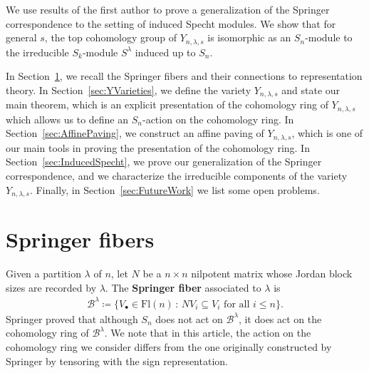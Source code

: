 \documentclass[submission]{FPSAC2021}
\theoremstyle{plain}
\numberwithin{equation}{section}
\newcommand{\SG}[1]{{\color{red} SG: #1}}
\newcommand{\bQ}{\mathbb{Q}}
\newcommand{\cB}{\mathcal{B}}
\newcommand{\st}{\,:\,}
\newcommand{\Fl}{\mathrm{Fl}}
\newcommand{\la}{\lambda}
\begin{document}
We use results of the first author to prove a generalization of the  Springer correspondence to the setting of induced Specht modules. We show that for general $s$, the top cohomology group of $Y_{n,\lambda,s}$ is isomorphic as an $S_n$-module to the irreducible $S_k$-module $S^\lambda$ induced up to $S_n$.

In Section~\ref{sec:SpringerFibers}, we recall the Springer fibers and their connections to representation theory.
In Section~\ref{sec:YVarieties}, we define the variety $Y_{n,\lambda,s}$ and state our main theorem, which is an explicit presentation of the cohomology ring of $Y_{n,\lambda,s}$ which allows us to define an $S_n$-action on the cohomology ring.
In Section~\ref{sec:AffinePaving}, we construct an affine paving of $Y_{n,\lambda,s}$, which is one of our main tools in proving the presentation of the cohomology ring.
In Section~\ref{sec:InducedSpecht}, we prove our generalization of the Springer correspondence, and we characterize the irreducible components of the variety $Y_{n,\la,s}$.
Finally, in Section~\ref{sec:FutureWork} we list some open problems.


\section{Springer fibers}\label{sec:SpringerFibers}

Given a partition $\lambda$ of $n$, let $N$ be a $n\times n$ nilpotent matrix whose Jordan block sizes are recorded by $\lambda$. The {\bf Springer fiber} associated to $\lambda$ is
\begin{align}
    \cB^\lambda \coloneqq \{V_\bullet \in \Fl(n) \st NV_i\subseteq V_i \text{ for all } i\leq n\}.
\end{align}
Springer proved that although $S_n$ does not act on $\cB^\lambda$, it does act on the cohomology ring of $\cB^\lambda$. We note that in this article, the action on the cohomology ring we consider differs from the one originally constructed by Springer by tensoring with the sign representation.
\end{document}
